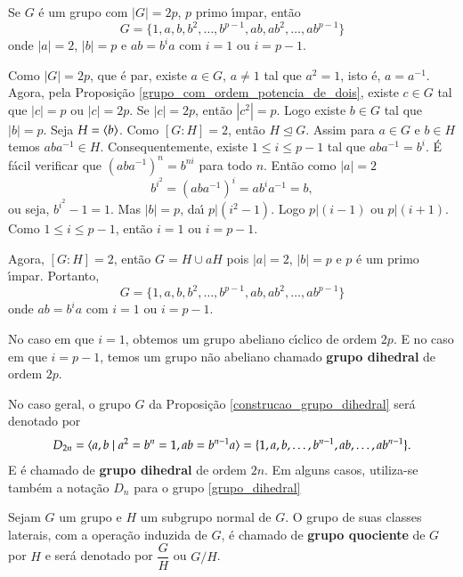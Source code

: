 \begin{proposicao}\label{construcao_grupo_dihedral}
	Se $G$ \'e um grupo com $|G| = 2p$, $p$ primo {\'\i}mpar, ent\~ao
	\[
		G = \{1, a, b, b^2, \dots, b^{p - 1}, ab, ab^2, \dots, ab^{p - 1}\}
	\]
	onde $|a| = 2$, $|b| = p$ e $ab = b^ia$ com $i = 1$ ou $i = p - 1$.
\end{proposicao}
\begin{prova}
	Como $|G| = 2p$, que \'e par, existe $a \in G$, $a \ne 1$ tal que $a^2 = 1$, isto \'e, $a = a^{-1}$. Agora, pela Proposi\c{c}\~ao \ref{grupo_com_ordem_potencia_de_dois}, existe $c \in G$ tal que $|c| = p$ ou $|c| = 2p$. Se $|c| = 2p$, ent\~ao $|c^2| = p$. Logo existe $b \in G$ tal que $|b| = p$. Seja $H = \langle{b}\rangle$. Como $[G:H] = 2$, ent\~ao $H \unlhd G$. Assim para $a \in G$ e $b \in H$ temos $aba^{-1} \in H$. Consequentemente, existe $1 \le i \le p - 1$ tal que $aba^{-1} = b^i$. \'E f\'acil verificar que $(aba^{-1})^n = b^{ni}$ para todo $n$. Ent\~ao como $|a| = 2$
	\[
		b^{i^2} = (aba^{-1})^i = ab^ia^{-1} = b,
	\]
	ou seja, $b^{i^2} - 1 = 1$. Mas $|b| = p$, da{\'\i} $p | (i^2 - 1)$. Logo $p | (i - 1)$ ou $p | (i + 1)$. Como $1 \le i \le p - 1$, ent\~ao $i = 1$ ou $i = p - 1$.

	Agora, $[G:H] = 2$, ent\~ao $G = H \cup aH$ pois $|a| = 2$, $|b| = p$ e $p$ \'e um primo {\'\i}mpar. Portanto,
	\[
		G = \{1, a, b, b^2, \dots, b^{p - 1}, ab, ab^2, \dots, ab^{p - 1}\}	
	\]
	onde $ab = b^ia$ com $i = 1$ ou $i = p - 1$.
\end{prova}

\begin{observacao}
	No caso em que $i = 1$, obtemos um grupo abeliano c{\'\i}clico de ordem $2p$. E no caso em que $i = p - 1$, temos um grupo n\~ao abeliano chamado \textbf{grupo dihedral} de ordem $2p$.
\end{observacao}

\begin{notacao}
	No caso geral, o grupo $G$ da Proposi\c{c}\~ao \ref{construcao_grupo_dihedral} ser\'a denotado por
	\begin{align}\label{grupo_dihedral}
		D_{2n} = \langle{a,b \mid a^2 = b^n = 1, ab = b^{n - 1}a}\rangle = \{1,a,b,\dots, b^{n - 1}, ab, \dots, ab^{n - 1}\}.
	\end{align}
	E \'e chamado de \textbf{grupo dihedral} de ordem $2n$. Em alguns casos, utiliza-se tamb\'em a nota\c{c}\~ao $D_n$ para o grupo \eqref{grupo_dihedral}
\end{notacao}

\begin{definicao}
	Sejam $G$ um grupo e $H$ um subgrupo normal de $G$. O grupo de suas classes laterais, com a opera\c{c}\~ao induzida de $G$, \'e chamado de \textbf{grupo quociente} de $G$ por $H$ e ser\'a denotado por $\dfrac{G}{H}$ ou $G/H$.
\end{definicao}

